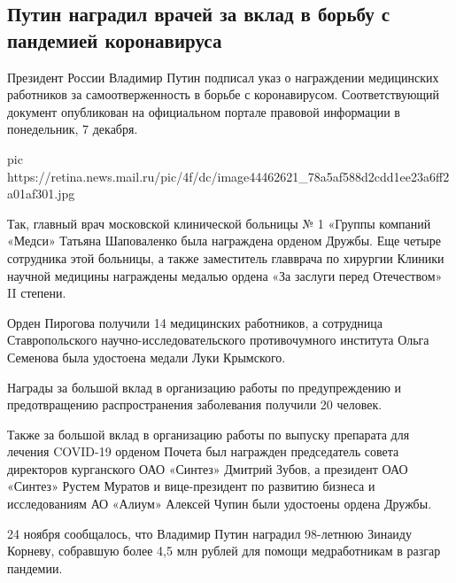  
 
 
 
 
 
\subsection{Путин наградил врачей за вклад в борьбу с пандемией коронавируса}
\label{sec:08_12_2020.news.ru.mail_ru.2.putin_vaccine_nagradil}

Президент России Владимир Путин подписал указ о награждении медицинских
работников за самоотверженность в борьбе с коронавирусом. Соответствующий
документ опубликован на официальном портале правовой информации в понедельник,
7 декабря.

\ifcmt
pic https://retina.news.mail.ru/pic/4f/dc/image44462621_78a5af588d2cdd1ee23a6ff2a01af301.jpg
\fi

Так, главный врач московской клинической больницы № 1 «Группы компаний «Медси»
Татьяна Шаповаленко была награждена орденом Дружбы. Еще четыре сотрудника этой
больницы, а также заместитель главврача по хирургии Клиники научной медицины
награждены медалью ордена «За заслуги перед Отечеством» II степени.

Орден Пирогова получили 14 медицинских работников, а сотрудница Ставропольского
научно-исследовательского противочумного института Ольга Семенова была
удостоена медали Луки Крымского.

Награды за большой вклад в организацию работы по предупреждению и
предотвращению распространения заболевания получили 20 человек.

Также за большой вклад в организацию работы по выпуску препарата для лечения
COVID-19 орденом Почета был награжден председатель совета директоров
курганского ОАО «Синтез» Дмитрий Зубов, а президент ОАО «Синтез» Рустем Муратов
и вице-президент по развитию бизнеса и исследованиям АО «Алиум» Алексей Чупин
были удостоены ордена Дружбы.

24 ноября сообщалось, что Владимир Путин наградил 98-летнюю Зинаиду Корневу,
собравшую более 4,5 млн рублей для помощи медработникам в разгар пандемии.
